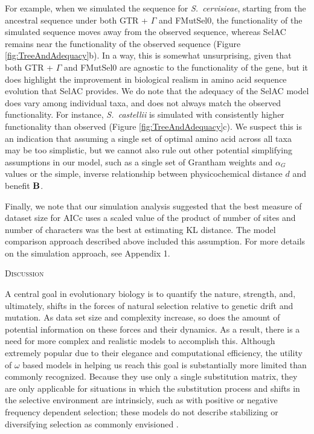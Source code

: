 \documentclass[12pt,letterpaper]{article}
\renewcommand{\section}[1]{%
\bigskip
\begin{center}
\begin{Large}
\normalfont\scshape #1
\medskip
\end{Large}
\end{center}}
\newcommand{\Func}{\ensuremath{\text{\textbf{B}}}\xspace}
\newcommand{\selac}{SelAC\xspace}
\newcommand{\alphag}{\ensuremath{\alpha_G}\xspace}
\begin{document}
For example, when we simulated the sequence for \emph{S.~cervisieae}, starting from the ancestral sequence under both GTR + $\Gamma$ and FMutSel0, the functionality of the simulated sequence moves away from the observed sequence, whereas SelAC remains near the functionality of the observed sequence (Figure \ref{fig:TreeAndAdequacy}b).
In a way, this is somewhat unsurprising, given that both GTR + $\Gamma$ and FMutSel0 are agnostic to the functionality of the gene, but it does highlight the improvement in biological realism in amino acid sequence evolution that \selac provides.
We do note that the adequacy of the \selac model does vary among individual taxa, and does not always match the observed functionality.
For instance, \emph{S.~castellii} is simulated with consistently higher functionality than observed (Figure \ref{fig:TreeAndAdequacy}c).
We suspect this is an indication that assuming a single set of optimal amino acid across all taxa may be too simplistic, but we cannot also rule out other potential simplifying assumptions in our model, such as a single set of Grantham weights and $\alphag$ values or the simple, inverse relationship between physicochemical distance $d$ and benefit \Func.

Finally, we note that our simulation analysis suggested that the best measure of dataset size for AICc uses a scaled value of the product of number of sites and number of characters was the best at estimating KL distance.
The model comparison approach described above included this assumption.
For more details on the simulation approach, see Appendix 1.


\section{Discussion}
A central goal in evolutionary biology is to quantify the nature, strength, and, ultimately, shifts in the forces of natural selection relative to genetic drift and mutation.
As data set size and complexity increase, so does the amount of potential information on these forces and their dynamics.
As a result, there is a need for more complex and realistic models \citep{GoldmanEtAl1996,ThorneEtAl1996,GoldmanEtAl1998,HalpernAndBruno1998,LartillotAndPhilippe2004} to accomplish this.
Although extremely popular due to their elegance and computational efficiency, the utility of $\omega$ based models in helping us reach this goal is substantially more limited than commonly recognized.
Because they use only a single substitution matrix, they are only applicable for situations in which the substitution process and shifts in the selective environment are intrinsicly, such as with positive or negative frequency dependent selection; these models do not describe stabilizing or diversifying selection as commonly envisioned \citep{Endler1986a,Pelmyr2002}.
\end{document}
